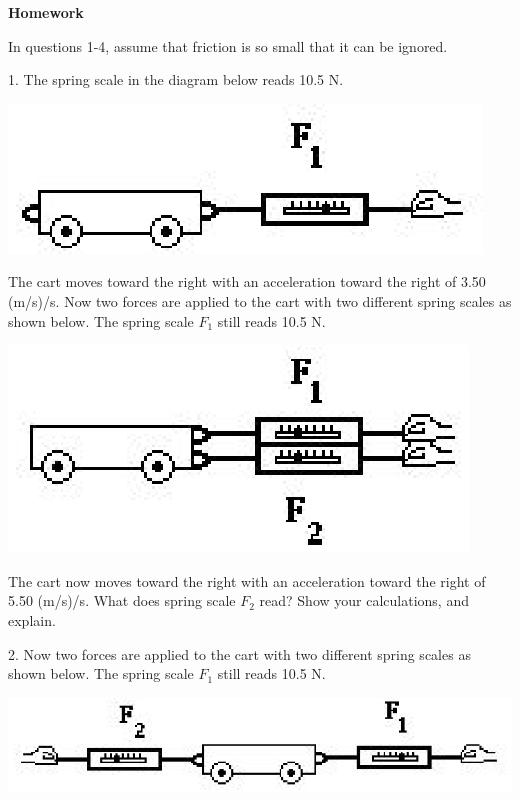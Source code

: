 \textbf{Homework}

In questions 1-4, assume that friction is so small that it can be ignored.

1. The spring scale in the diagram below reads 10.5 N.

\vspace{0.3cm}
{\par\centering \includegraphics{combining/combining_fig2.eps} \par}
\vspace{0.3cm}

The cart moves toward the right with an acceleration toward the right of 3.50
(m/s)/s. Now two forces are applied to the cart with two different spring scales
as shown below. The spring scale \( F_{1} \) still reads 10.5 N.

\vspace{0.3cm}
{\par\centering \includegraphics{combining/combining_fig3.eps} \par}
\vspace{0.3cm}

The cart now moves toward the right with an acceleration toward the right of
5.50 (m/s)/s. What does spring scale \( F_{2} \) read? Show your calculations,
and explain.
\vspace{20mm}

2. Now two forces are applied to the cart with two different spring scales as
shown below. The spring scale \( F_{1} \) still reads 10.5 N.

\vspace{0.3cm}
{\par\centering \includegraphics{combining/combining_fig4.eps} \par}
\vspace{0.3cm}

